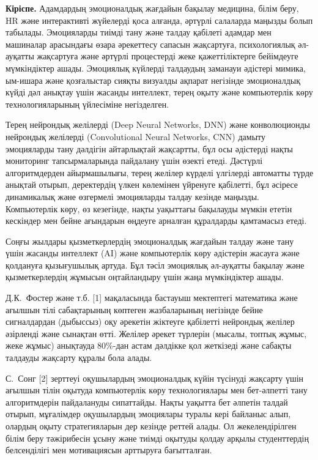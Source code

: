 \begin{multicols}{2}
{\bfseries Кіріспе.} Адамдардың эмоционалдық жағдайын бақылау медицина,
білім беру, HR және интерактивті жүйелерді қоса алғанда, әртүрлі
салаларда маңызды болып табылады. Эмоцияларды тиімді тану және талдау
қабілеті адамдар мен машиналар арасындағы өзара әрекеттесу сапасын
жақсартуға, психологиялық әл-ауқатты жақсартуға және әртүрлі процестерді
жеке қажеттіліктерге бейімдеуге мүмкіндіктер ашады. Эмоциялық күйлерді
талдаудың заманауи әдістері мимика, ым-ишара және қозғалыстар сияқты
визуалды ақпарат негізінде эмоционалдық күйді дәл анықтау үшін жасанды
интеллект, терең оқыту және компьютерлік көру технологияларының
үйлесіміне негізделген.

Терең нейрондық желілерді (Deep Neural Networks, DNN) және конволюционды
нейрондық желілерді (Convolutional Neural Networks, CNN) дамыту
эмоцияларды тану дәлдігін айтарлықтай жақсартты, бұл осы әдістерді нақты
мониторинг тапсырмаларында пайдалану үшін өзекті етеді. Дәстүрлі
алгоритмдерден айырмашылығы, терең желілер күрделі үлгілерді автоматты
түрде анықтай отырып, деректердің үлкен көлемінен үйренуге қабілетті,
бұл әсіресе динамикалық және өзгермелі эмоцияларды талдау кезінде
маңызды. Компьютерлік көру, өз кезегінде, нақты уақыттағы бақылауды
мүмкін ететін кескіндер мен бейне ағындарын өңдеуге арналған құралдарды
қамтамасыз етеді.

Соңғы жылдары қызметкерлердің эмоционалдық жағдайын талдау және тану
үшін жасанды интеллект (AI) және компьютерлік көру әдістерін жасауға
және қолдануға қызығушылық артуда. Бұл тәсіл эмоциялық әл-ауқатты
бақылау және қызметкерлердің жұмысын оңтайландыру үшін жаңа мүмкіндіктер
ашады.

Д.К.~Фостер және т.б. {[}1{]} мақаласында бастауыш мектептегі математика
және ағылшын тілі сабақтарының көптеген жазбаларының негізінде бейне
сигналдардан (дыбыссыз) оқу әрекетін жіктеуге қабілетті нейрондық
желілер әзірленді және сынақтан өтті. Желілер әрекет түрлерін (мысалы,
топтық жұмыс, жеке жұмыс) анықтауда 80\%-дан астам дәлдікке қол
жеткізеді және сабақты талдауды жақсарту құралы бола алады.

С.~Сонг {[}2{]} зерттеуі оқушылардың эмоционалдық күйін түсінуді
жақсарту үшін ағылшын тілін оқытуда компьютерлік көру технологиялары мен
бет-әлпетті тану алгоритмдерін пайдалануды сипаттайды. Нақты уақытта бет
әлпетін талдай отырып, мұғалімдер оқушылардың эмоциялары туралы кері
байланыс алып, олардың оқыту стратегияларын дер кезінде реттей алады. Ол
жекелендірілген білім беру тәжірибесін ұсыну және тиімді оқытуды қолдау
арқылы студенттердің белсенділігі мен мотивациясын арттыруға
бағытталған.


\end{multicols}
